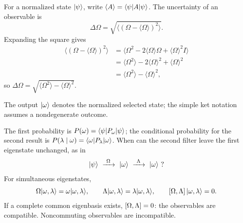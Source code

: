 For a normalized state $\lvert \psi\rangle$, write
$\langle A\rangle=\langle \psi\rvert A\lvert \psi\rangle$. The uncertainty of an observable is
\[
 \Delta\Omega=\sqrt{\bigl\langle(\Omega-\langle\Omega\rangle)^2\bigr\rangle}.
\]
Expanding the square gives
\begin{align*}
 \bigl\langle(\Omega-\langle\Omega\rangle)^2\bigr\rangle
 &=\langle\Omega^2-2\langle\Omega\rangle\Omega+\langle\Omega\rangle^2I\rangle\\
 &=\langle\Omega^2\rangle-2\langle\Omega\rangle^2+\langle\Omega\rangle^2\\
 &=\langle\Omega^2\rangle-\langle\Omega\rangle^2,
\end{align*}
so $\Delta\Omega=\sqrt{\langle\Omega^2\rangle-\langle\Omega\rangle^2}$.
\begin{center}
\end{center}
The output $\lvert \omega\rangle$ denotes the normalized selected state; the
simple ket notation assumes a nondegenerate outcome.
\begin{center}
\end{center}
The first probability is $P(\omega)=\langle \psi\rvert P_\omega\lvert \psi\rangle$;
the conditional probability for the second result is
$P(\lambda\mid\omega)=\langle \omega\rvert P_\lambda\lvert \omega\rangle$.
When can the second filter leave the first eigenstate unchanged, as in
\[
 \ket\psi\ \xrightarrow{\ \Omega\ }\ \ket\omega
 \ \xrightarrow{\ \Lambda\ }\ \ket\omega\ ?
\]
For simultaneous eigenstates,
\[
 \Omega\lvert \omega,\lambda\rangle=\omega\lvert \omega,\lambda\rangle,\qquad
 \Lambda\lvert \omega,\lambda\rangle=\lambda\lvert \omega,\lambda\rangle,
 \qquad \left[\Omega,\Lambda\right]\lvert \omega,\lambda\rangle=0.
\]
If a complete common eigenbasis exists, $\left[\Omega,\Lambda\right]=0$:
the observables are compatible. Noncommuting observables are incompatible.
